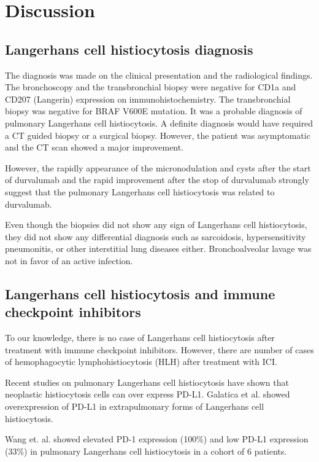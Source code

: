 \documentclass{article}
\begin{document}
\section{Discussion}
\subsection{Langerhans cell histiocytosis diagnosis}
The diagnosis was made on the clinical presentation and the radiological findings. The bronchoscopy and the transbronchial biopsy were negative for CD1a and CD207 (Langerin) expression on immunohistochemistry. The transbronchial biopsy was negative for BRAF V600E mutation.
It was a probable diagnosis of pulmonary Langerhans cell histiocytosis. A definite diagnosis would have required a CT guided biopsy or a surgical biopsy. However, the patient was asymptomatic and the CT scan showed a major improvement. 

However, the rapidly appearance of the micronodulation and cysts after the start of durvalumab and the rapid improvement after the stop of durvalumab strongly suggest that the pulmonary Langerhans cell histiocytosis was related to durvalumab.

Even though the biopsies did not show any sign of Langerhans cell histiocytosis, they did not show any differential diagnosis such as sarcoidosis, hypersensitivity pneumonitis, or other interstitial lung diseases either. Bronchoalveolar lavage was not in favor of an active infection.

\subsection{Langerhans cell histiocytosis and immune checkpoint inhibitors}
To our knowledge, there is no case of Langerhans cell histiocytosis after treatment with immune checkpoint inhibitors. 
However, there are number of cases of hemophagocytic lymphohistiocytosis (HLH) after treatment with ICI. \cite{sadaat_hemophagocytic_2018, takeshita_coincidence_2017, noseda_haemophagocytic_2019}

Recent studies on pulmonary Langerhans cell histiocytosis have shown that neoplastic histiocytosis cells can over express PD-L1.
Galatica et al. showed overexpression of PD-L1 in extrapulmonary forms of Langerhans cell histiocytosis.

Wang et. al. showed elevated PD-1 expression (100\%) and low PD-L1 expression (33\%) in pulmonary Langerhans cell histiocytosis in a cohort of 6 patients.
\end{document}
